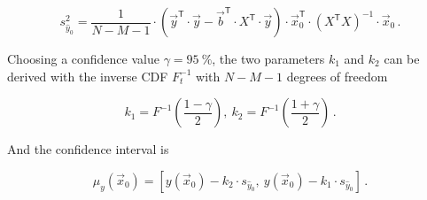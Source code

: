 \begin{equation}
s_{\hat{y}_0}^2 = \frac{1}{N-M-1}\cdot\left(\vec{y}^{\mathsf T}\cdot\vec{y}-\vec{b}^{\mathsf T}\cdot X^{\mathsf T}\cdot \vec{y}\right)\cdot \vec{x}_0^{\mathsf T}\cdot \left(X^{\mathsf T} X\right)^{-1} \cdot \vec{x}_0\,.
\end{equation}

Choosing a confidence value $\gamma = \SI{95}{\percent}$, the two parameters $k_1$ and $k_2$ can be derived with the inverse \ac{CDF} $F_t^{-1}$ with $N-M-1$ degrees of freedom

\begin{equation}
k_1 = F^{-1}\left(\frac{1-\gamma}{2}\right),\ k_2 = F^{-1}\left(\frac{1+\gamma}{2}\right)\,.
\end{equation}

And the confidence interval is

\begin{equation}
\mu_y\left(\vec{x}_0\right) =\left[ y\left(\vec{x}_0\right)-k_2\cdot s_{\hat{y}_0},\ y\left(\vec{x}_0\right)-k_1\cdot s_{\hat{y}_0}\right]\,.
\label{eq:conv}
\end{equation}


